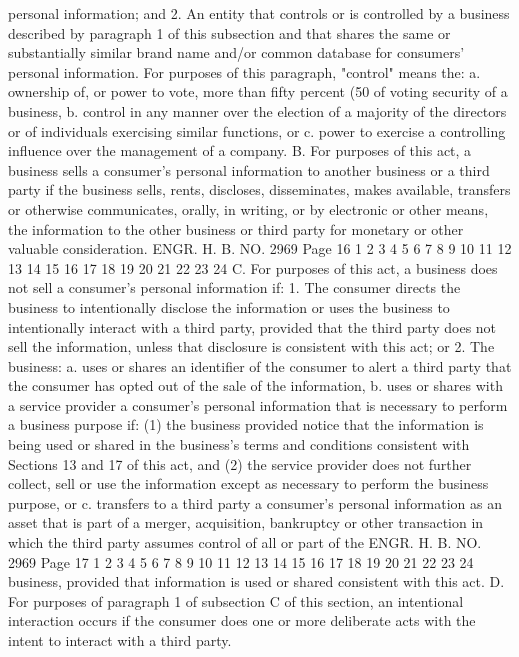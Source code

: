 personal information; and
2. An entity that controls or is controlled by a business
described by paragraph 1 of this subsection and that shares the same
or substantially similar brand name and/or common database for
consumers' personal information. For purposes of this paragraph,
"control" means the:
a. ownership of, or power to vote, more than fifty
percent (50%
of voting security of a business,
b. control in any manner over the election of a majority
of the directors or of individuals exercising similar
functions, or
c. power to exercise a controlling influence over the
management of a company.
B. For purposes of this act, a business sells a consumer's
personal information to another business or a third party if the
business sells, rents, discloses, disseminates, makes available,
transfers or otherwise communicates, orally, in writing, or by
electronic or other means, the information to the other business or
third party for monetary or other valuable consideration.
ENGR. H. B. NO. 2969 Page 16
1
2
3
4
5
6
7
8
9
10
11
12
13
14
15
16
17
18
19
20
21
22
23
24
C. For purposes of this act, a business does not sell a
consumer's personal information if:
1. The consumer directs the business to intentionally disclose
the information or uses the business to intentionally interact with
a third party, provided that the third party does not sell the
information, unless that disclosure is consistent with this act; or
2. The business:
a. uses or shares an identifier of the consumer to alert
a third party that the consumer has opted out of the
sale of the information,
b. uses or shares with a service provider a consumer's
personal information that is necessary to perform a
business purpose if:
(1) the business provided notice that the information
is being used or shared in the business's terms
and conditions consistent with Sections 13 and 17
of this act, and
(2) the service provider does not further collect,
sell or use the information except as necessary
to perform the business purpose, or
c. transfers to a third party a consumer's personal
information as an asset that is part of a merger,
acquisition, bankruptcy or other transaction in which
the third party assumes control of all or part of the 
ENGR. H. B. NO. 2969 Page 17
1
2
3
4
5
6
7
8
9
10
11
12
13
14
15
16
17
18
19
20
21
22
23
24
business, provided that information is used or shared
consistent with this act.
D. For purposes of paragraph 1 of subsection C of this section,
an intentional interaction occurs if the consumer does one or more
deliberate acts with the intent to interact with a third party.
